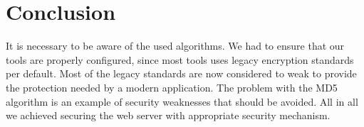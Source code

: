 \section {Conclusion} %

It is necessary to be aware of the used algorithms. We had to ensure that our tools are properly configured, since most tools uses legacy encryption standards per default. Most of the legacy standards are now considered to weak to provide the protection needed by a modern application.  The problem with the MD5 algorithm is an example of security weaknesses that should be avoided. All in all we achieved securing the web server with appropriate security mechanism. 

